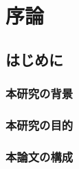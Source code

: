 \documentclass[a4paper,10pt,onecolumn,oneside,openany]{jsbook}
\begin{document}
\part{序論} %
\chapter{はじめに}
\section{本研究の背景}



\section{本研究の目的}


\section{本論文の構成}






\end{document}
